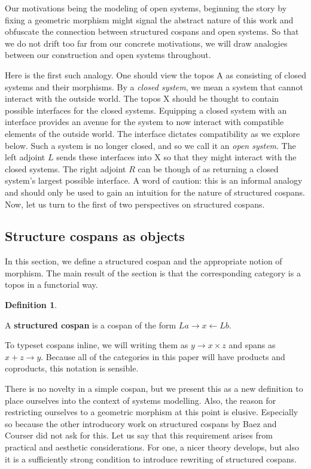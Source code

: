 \documentclass{amsart}
\newcommand{\A}{\cat{A}}
\newcommand{\X}{\cat{X}}
\newcommand{\defn}[1]{\textbf{#1}}
\newcommand{\cat}[1]{\mathrm{#1}}
\newcommand{\spn}[3]{#1 + #3 \to #2}
\newcommand{\csp}[3]{#2 \to #1 \times #3}
\theoremstyle{remark}
\theoremstyle{definition}
\newtheorem{definition}[theorem]{Definition}
\begin{document}
Our motivations being the modeling of open systems, beginning
the story by fixing a geometric morphism might signal the abstract
nature of this work and obfuscate the connection between structured
cospans and open systems. So that we do not drift too far from our
concrete motivations, we will draw analogies between our construction
and open systems throughout.  

Here is the first such analogy. One should view the topos $ \A $ as
consisting of closed systems and their morphisms. By a \emph{closed
  system}, we mean a system that cannot interact with the outside
world. The topos $ \X $ should be thought to contain possible
interfaces for the closed systems. Equipping a closed system with an
interface provides an avenue for the system to now interact with
compatible elements of the outside world. The interface dictates
compatibility as we explore below.  Such a system is no longer closed,
and so we call it an \emph{open system}. The left adjoint $ L $ sends
these interfaces into $ \X $ so that they might interact with the
closed systems. The right adjoint $ R $ can be though of as returning
a closed system's largest possible interface. A word of caution: this
is an informal analogy and should only be used to gain an intuition
for the nature of structured cospans. Now, let us turn to the first of
two perspectives on structured cospans.

\subsection{Structure cospans as objects}
\label{sec:strcsp-as-object}


In this section, we define a structured cospan and the appropriate
notion of morphism. The main result of the section is that the
corresponding category is a topos in a functorial way.

\begin{definition}\label{df:strcsp}

  A \defn{ structured cospan } is a cospan of the form
  $ La \to x \gets Lb $.
  
\end{definition}

To typeset cospans inline, we will writing them as $
\csp{x}{y}{z} $ and spans as $ \spn{x}{y}{z} $. Because all of the
categories in this paper will have products and coproducts, this
notation is sensible.  

There is no novelty in a simple cospan, but we present this as a new
definition to place ourselves into the context of systems
modelling. Also, the reason for restricting ourselves to a geometric
morphism at this point is elusive. Especially so because the other
introducory work on structured cospans by Baez and Courser did not ask
for this. Let us say that this requirement arises from practical and aesthetic
considerations. For one, a nicer theory develops, but also it is a
sufficiently strong condition to introduce rewriting of structured cospans.
\end{document}
